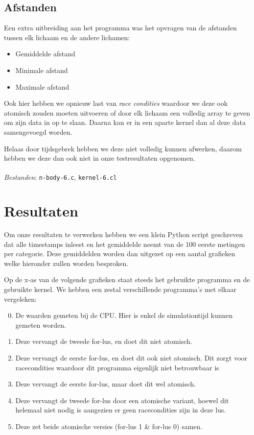 \documentclass{article}
\begin{document}
\subsection{Afstanden}
Een extra uitbreiding aan het programma was het opvragen van de afstanden tussen
elk lichaam en de andere lichamen:

\begin{itemize}
    \item Gemiddelde afstand
    \item Minimale afstand
    \item Maximale afstand
\end{itemize}

Ook hier hebben we opnieuw last van \textit{race condities} waardoor we deze ook
atomisch zouden moeten uitvoeren of door elk lichaam een volledig array te geven
om zijn data in op te slaan. Daarna kan er in een aparte kernel dan al deze data
samengevoegd worden.

Helaas door tijdsgebrek hebben we deze niet volledig kunnen afwerken, daarom hebben
we deze dan ook niet in onze testresultaten opgenomen.
\\
\\
\textit{Bestanden}: \texttt{n-body-6.c}, \texttt{kernel-6.cl}


\section{Resultaten}
Om onze resultaten te verwerken hebben we een klein Python script geschreven dat
alle timestamps inleest en het gemiddelde neemt van de 100 eerste metingen per
categorie. Deze gemiddelden worden dan uitgezet op een aantal grafieken welke
hieronder zullen worden besproken.

Op de x-as van de volgende grafieken staat steeds het gebruikte programma en
de gebruikte kernel. We hebben een zestal verschillende programma's met elkaar vergeleken:
\begin{enumerate}
\setcounter{enumi}{-1}
    \item De waarden gemeten bij de CPU. Hier is enkel de simulationtijd kunnen gemeten worden.
    \item Deze vervangt de tweede for-lus, en doet dit niet atomisch.
    \item Deze vervangt de eerste for-lus, en doet dit ook niet atomisch. Dit zorgt voor
    racecondities waardoor dit programma eigenlijk niet betrouwbaar is
    \item Deze vervangt de eerste for-lus, maar doet dit wel atomisch.
    \item Deze vervangt de tweede for-lus door een atomische variant, hoewel dit helemaal niet
    nodig is aangezien er geen racecondities zijn in deze lus.
    \item Deze zet beide atomische versies (for-lus 1 \& for-lus 0) samen.
\end{enumerate}
\end{document}
